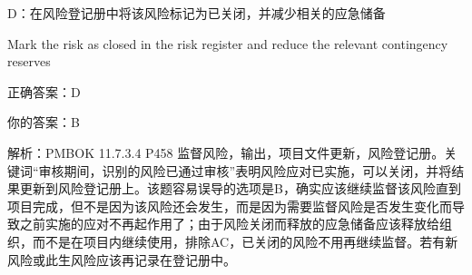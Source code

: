 D：在风险登记册中将该风险标记为已关闭，并减少相关的应急储备

Mark the risk as closed in the risk register and reduce the relevant contingency reserves

正确答案：D

你的答案：B

解析：PMBOK 11.7.3.4 P458 监督风险，输出，项目文件更新，风险登记册。关键词“审核期间，识别的风险已通过审核”表明风险应对已实施，可以关闭，并将结果更新到风险登记册上。该题容易误导的选项是B，确实应该继续监督该风险直到项目完成，但不是因为该风险还会发生，而是因为需要监督风险是否发生变化而导致之前实施的应对不再起作用了；由于风险关闭而释放的应急储备应该释放给组织，而不是在项目内继续使用，排除AC，已关闭的风险不用再继续监督。若有新风险或此生风险应该再记录在登记册中。

